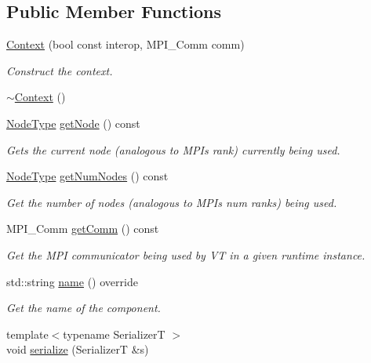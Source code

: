 \subsection*{Public Member Functions}
\begin{DoxyCompactItemize}
\item 
\hyperlink{structvt_1_1ctx_1_1_context_aa00297fe6a9bde8202b4099ede6069fc}{Context} (bool const interop, M\+P\+I\+\_\+\+Comm comm)
\begin{DoxyCompactList}\small\item\em Construct the context. \end{DoxyCompactList}\item 
\hyperlink{structvt_1_1ctx_1_1_context_aa916f841807f2a1b913df33f782715af}{$\sim$\+Context} ()
\item 
\hyperlink{namespacevt_a866da9d0efc19c0a1ce79e9e492f47e2}{Node\+Type} \hyperlink{structvt_1_1ctx_1_1_context_a0d52c263ce8516546a67443d9a86fa5f}{get\+Node} () const
\begin{DoxyCompactList}\small\item\em Gets the current node (analogous to M\+PI\textquotesingle{}s rank) currently being used. \end{DoxyCompactList}\item 
\hyperlink{namespacevt_a866da9d0efc19c0a1ce79e9e492f47e2}{Node\+Type} \hyperlink{structvt_1_1ctx_1_1_context_a7f41071aadf6d5fa9e1b6c703c5ff19d}{get\+Num\+Nodes} () const
\begin{DoxyCompactList}\small\item\em Get the number of nodes (analogous to M\+PI\textquotesingle{}s num ranks) being used. \end{DoxyCompactList}\item 
M\+P\+I\+\_\+\+Comm \hyperlink{structvt_1_1ctx_1_1_context_a2d4378c97824792991a3410449cf19db}{get\+Comm} () const
\begin{DoxyCompactList}\small\item\em Get the M\+PI communicator being used by VT in a given runtime instance. \end{DoxyCompactList}\item 
std\+::string \hyperlink{structvt_1_1ctx_1_1_context_a6bef35c171d45feb409d7b6aa6168996}{name} () override
\begin{DoxyCompactList}\small\item\em Get the name of the component. \end{DoxyCompactList}\item 
{\footnotesize template$<$typename SerializerT $>$ }\\void \hyperlink{structvt_1_1ctx_1_1_context_a510b7a30a4e10b95528a8a9c2306a075}{serialize} (SerializerT \&s)

\end{DoxyCompactItemize}
